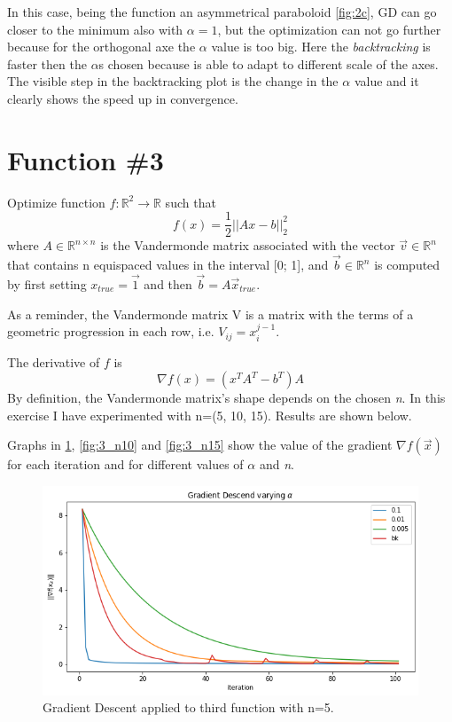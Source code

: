 \documentclass[a4paper,10pt]{report}
\begin{document}
In this case, being the function an asymmetrical paraboloid \ref{fig:2c}, GD can go closer to the minimum also with $\alpha=1$, but the optimization can not go further because for the orthogonal axe the $\alpha$ value is too big.
Here the \emph{backtracking} is faster then the $\alpha$s chosen because is able to adapt to different scale of the axes.
The visible step in the backtracking plot is the change in the $\alpha$ value and it clearly shows the speed up in convergence.

\section{Function \#3}
Optimize function $f:\mathbb{R}^2 \rightarrow \mathbb{R}$ such that
\begin{equation}
  f(x)=\frac{1}{2}||Ax-b||_2^2
\end{equation}
where $A\in \mathbb{R}^{n\times n}$ is the Vandermonde matrix  associated with the vector $\vec{v}\in\mathbb{R}^n$ that contains
n equispaced values in the interval [0; 1], and $\vec{b}\in\mathbb{R}^n$ is computed by first setting $x_{true}=\vec{1}$ and then $\vec{b} = A\vec{x}_{true}$.

As a reminder, the Vandermonde matrix V is a matrix with the terms of a geometric progression in each row, i.e. $V_{ij}=x_i^{j-1}$.

The derivative of $f$ is
\begin{equation}
  \nabla f(x)= (x^TA^T-b^T)A
\end{equation}
By definition, the Vandermonde matrix's shape depends on the chosen \emph{n}. In this exercise I have experimented with n=(5, 10, 15). Results are shown below.

Graphs in \ref{fig:3}, \ref{fig:3_n10} and \ref{fig:3_n15} show the value of the gradient $\nabla f(\vec{x})$ for each iteration and for different values of $\alpha$ and \emph{n}.

\begin{figure}[!htb]
  \center
  \includegraphics[width=0.8\linewidth]{3_a.png}
  \caption{Gradient Descent applied to third function with n=5.}
  \label{fig:3}
\end{figure}
\end{document}
